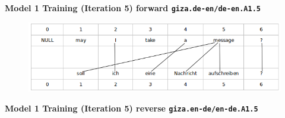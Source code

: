 \documentclass[12pt,fleqn]{article}
\begin{document}
\begin{enumerate}
\begin{enumerate}
\begin{itemize}
 \vspace{0.5cm}
 \textbf{Model 1 Training (Iteration 5) forward \texttt{giza.de-en/de-en.A1.5}} \\ 
 
%  
 \begin{figure} [h]
 \includegraphics[width=15cm]{2d_sol1.png} 
\end{figure}
 
 
 \vspace{0.5cm} 
 \textbf{Model 1 Training (Iteration 5) reverse \texttt{giza.en-de/en-de.A1.5}} \\ 
 

\end{itemize}
\end{enumerate}
\end{enumerate}
\end{document}
